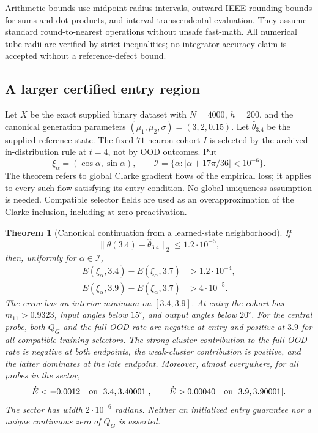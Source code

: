\documentclass[10pt]{article}
\newtheorem{theorem}{Theorem}[section]
\begin{document}
Arithmetic bounds use midpoint-radius intervals, outward IEEE rounding
bounds for sums and dot products, and interval transcendental evaluation.
They assume standard round-to-nearest operations without unsafe fast-math.
All numerical tube radii are verified by strict inequalities; no integrator
accuracy claim is accepted without a reference-defect bound.

\subsection{A larger certified entry region}
Let $X$ be the exact supplied binary dataset with $N=4000$, $h=200$,
and the canonical generation parameters $(\mu_1,\mu_2,\sigma)=(3,2,0.15)$.
Let $\widehat\theta_{3.4}$ be the supplied reference state. The fixed
$71$-neuron cohort $I$ is selected by the archived in-distribution rule at
$t=4$, not by OOD outcomes. Put
\[
 \xi_\alpha=(\cos\alpha,\sin\alpha),\qquad
 \mathcal I=\{\alpha:|\alpha+17\pi/36|<10^{-6}\}.
\]
The theorem refers to global Clarke gradient flows of the empirical loss;
it applies to every such flow satisfying its entry condition. No global
uniqueness assumption is needed. Compatible selector fields are used as an
overapproximation of the Clarke inclusion, including at zero preactivation.

\begin{theorem}[Canonical continuation from a learned-state neighborhood]
\label{initcert:wide-theorem}
If
\begin{equation}\label{initcert:entry}
 \|\theta(3.4)-\widehat\theta_{3.4}\|_2\le1.2\cdot10^{-5},
\end{equation}
then, uniformly for $\alpha\in\mathcal I$,
\begin{align*}
 E(\xi_\alpha,3.4)-E(\xi_\alpha,3.7)&>1.2\cdot10^{-4},\\
 E(\xi_\alpha,3.9)-E(\xi_\alpha,3.7)&>4\cdot10^{-5}.
\end{align*}
The error has an interior minimum on $[3.4,3.9]$. At entry the cohort has
$m_{11}>0.9323$, input angles below $15^\circ$, and output angles below
$20^\circ$. For the central probe, both $Q_G$ and the full OOD rate are
negative at entry and positive at $3.9$ for all compatible training selectors.
The strong-cluster contribution to the full OOD rate is negative at both
endpoints, the weak-cluster contribution is positive, and the latter
dominates at the late endpoint.
Moreover, almost everywhere, for all probes in the sector,
\[
 \dot E<-0.0012\quad\hbox{on }[3.4,3.40001],\qquad
 \dot E>0.00040\quad\hbox{on }[3.9,3.90001].
\]
The sector has width $2\cdot10^{-6}$ radians. Neither an initialized
entry guarantee nor a unique continuous zero of $Q_G$ is asserted.
\end{theorem}
\end{document}

